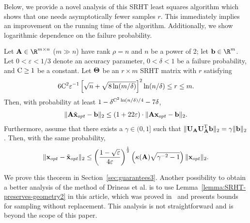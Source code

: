 Below, we provide a novel analysis of this SRHT least squares algorithm which shows that one needs
asymptotically fewer samples $r$. This immediately implies an improvement on the running time of the algorithm.
Additionally, we show logarithmic dependence on the failure probability.
\begin{theorem}
\label{regression1}
Let $\matA \in \R^{m \times n}$ ($m \gg n$) have rank $\rho=n$ and $n$ be a power of 2; let $\b \in \R^m$.  Let $0 < \varepsilon < 1/3$
denote an accuracy parameter, $0 < \delta < 1$ be a failure probability, and $\mathrm{C}\ge 1$ be a constant.
Let ${\bm{\mathrm{\Theta}}}$ be an $r \times m$ SRHT matrix with $r$ satisfying
\[
 6 \mathrm{C}^2 \varepsilon^{-1} \left[\sqrt{n} + \sqrt{8\ln(m/\delta)} \right]^2 \ln(n/\delta) \leq r \leq m.
\]
Then, with probability at least $1 -  \delta^{\mathrm{C}^2\ln(n/\delta)/4} - 7\delta$,
\[
\mbox{}\|{\bm{\mathrm{A}}} \tilde{{\mathbf x}}_{opt}-{\mathbf b} \|_2 \le  \left( 1 +  22 \varepsilon \right) \cdot \mbox{}\|{\bm{\mathrm{A}}} {\mathbf x}_{opt}-{\mathbf b}\|_2.
\]
Furthermore, assume that there exists a $\gamma \in (0,1]$ such that $ \mbox{}\|{\bm{\mathrm{U}}}_{{\bm{\mathrm{A}}}} {\bm{\mathrm{U}}}_{{\bm{\mathrm{A}}}}^{\textsc{T}}{\mathbf b}\|_2 = \gamma \mbox{}\|{\mathbf b}\|_2$.
Then, with the same probability,
\[
 \mbox{}\| {\mathbf x}_{opt} - \tilde{{\mathbf x}}_{opt} \|_2 \le \left( { 1-\sqrt{\varepsilon} \over 4 \varepsilon} \right)^{{1\over 2}} \left( \kappa{ \left( {\ensuremath{\bm{\mathrm{A}}}}\right)} \sqrt{ \gamma^{-2}   - 1 } \right) \mbox{}\|{\mathbf x}_{opt}\|_2.
\]
\end{theorem}
\noindent
We prove this theorem in  Section~\ref{sec:guarantees3}. Another possibility to obtain a better analysis of the method of Drineas et al.
is to use Lemma~\ref{lemma:SRHT-preserves-geometry2} in this article, which was proved in~\cite{IW12} and presents bounds for sampling without
replacement. This analysis is not straightforward and is beyond the scope of this paper.


